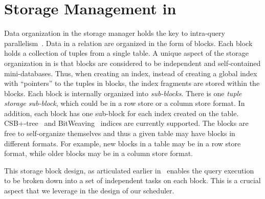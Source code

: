 \section{Storage Management in \sys{}}\label{apx:storage-manager}
Data organization in the \sys{} storage manager holds the key to intra-query 
parallelism~\cite{qsstorage}. 
Data in a relation are organized in the form of blocks. 
Each block holds a collection of tuples from a single table. 
A unique aspect of the storage organization in \sys{} is that blocks are considered to 
be independent and self-contained mini-databases. 
Thus, when creating an index, instead of creating a global index with 
``pointers'' to the tuples in blocks, the index fragments are stored within the blocks. 
Each block is internally organized into \textit{sub-blocks}. 
There is one \textit{tuple storage sub-block}, which could be in a row store or a 
column store format.
In addition, each block has one sub-block for each index created on the table. 
CSB+-tree~\cite{csb+-tree} and BitWeaving~\cite{bitweaving} 
indices are currently supported. 
The blocks are free to self-organize themselves and thus a given table may have blocks in different formats. 
For example, new blocks in a table may be in a row store format, while older blocks may 
be in a column store format.

This storage block design, as articulated earlier in~\cite{qsstorage} enables the query execution to be broken down into a set of independent tasks on each block. 
This is a crucial aspect that we leverage in the design of our scheduler. 


